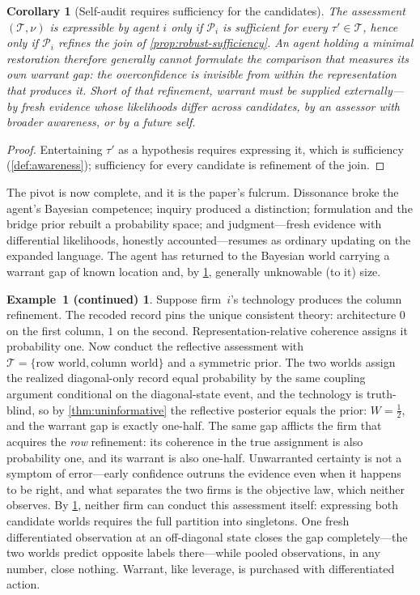 \documentclass[11pt]{article}
\newtheorem{corollary}[assumption]{Corollary}
\theoremstyle{definition}
\newtheorem*{excont}{Example~1 (continued)}
\begin{document}
\begin{corollary}[Self-audit requires sufficiency for the candidates]
\label{cor:self-audit}
The assessment $(\mathcal T,\nu)$ is expressible by agent $i$ only if $\mathcal P_i$ is sufficient for every $\tau'\in\mathcal T$, hence only if $\mathcal P_i$ refines the join of \cref{prop:robust-sufficiency}.
An agent holding a minimal restoration therefore generally cannot formulate the comparison that measures its own warrant gap: the overconfidence is invisible from within the representation that produces it.
Short of that refinement, warrant must be supplied externally---by fresh evidence whose likelihoods differ across candidates, by an assessor with broader awareness, or by a future self.
\end{corollary}

\begin{proof}
Entertaining $\tau'$ as a hypothesis requires expressing it, which is sufficiency (\cref{def:awareness}); sufficiency for every candidate is refinement of the join.
\end{proof}

The pivot is now complete, and it is the paper's fulcrum.
Dissonance broke the agent's Bayesian competence; inquiry produced a distinction; formulation and the bridge prior rebuilt a probability space; and judgment---fresh evidence with differential likelihoods, honestly accounted---resumes as ordinary updating on the expanded language.
The agent has returned to the Bayesian world carrying a warrant gap of known location and, by \cref{cor:self-audit}, generally unknowable (to it) size.

\begin{excont}
Suppose firm~$i$'s technology produces the column refinement.
The recoded record pins the unique consistent theory: architecture $0$ on the first column, $1$ on the second.
Representation-relative coherence assigns it probability one.
Now conduct the reflective assessment with $\mathcal T=\{\text{row world},\text{column world}\}$ and a symmetric prior.
The two worlds assign the realized diagonal-only record equal probability by the same coupling argument conditional on the diagonal-state event, and the technology is truth-blind, so by \cref{thm:uninformative} the reflective posterior equals the prior: $W=\tfrac12$, and the warrant gap is exactly one-half.
The same gap afflicts the firm that acquires the \emph{row} refinement: its coherence in the true assignment is also probability one, and its warrant is also one-half.
Unwarranted certainty is not a symptom of error---early confidence outruns the evidence even when it happens to be right, and what separates the two firms is the objective law, which neither observes.
By \cref{cor:self-audit}, neither firm can conduct this assessment itself: expressing both candidate worlds requires the full partition into singletons.
One fresh differentiated observation at an off-diagonal state closes the gap completely---the two worlds predict opposite labels there---while pooled observations, in any number, close nothing.
Warrant, like leverage, is purchased with differentiated action.
\end{excont}
\end{document}
